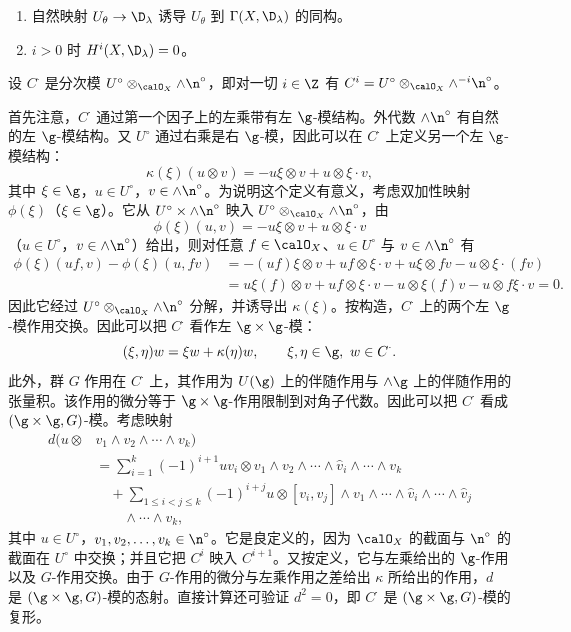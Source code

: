 \begin{theorem}\label{thm:02.2.6.1}
\begin{enumerate}[label=(\roman*)]
  \item 自然映射 $U_\theta\to \D_\lambda$ 诱导 $U_\theta$ 到 $\Gamma(X,\D_\lambda)$ 的同构。
  \item $i>0$ 时 $H^i(X,\D_\lambda)=0$。
\end{enumerate}
\end{theorem}

设 $C^\cdot$ 是分次模 $U^\circ\otimes_{\calO_X}\wedge\n^\circ$，即对一切 $i\in\Z$ 有 $C^i=U^\circ\otimes_{\calO_X}\wedge^{-i}\n^\circ$。

首先注意，$C^\cdot$ 通过第一个因子上的左乘带有左 $\g$-模结构。外代数 $\wedge\n^\circ$ 有自然的左 $\g$-模结构。又 $U^\circ$ 通过右乘是右 $\g$-模，因此可以在 $C^\cdot$ 上定义另一个左 $\g$-模结构：
\[
\kappa(\xi)(u\otimes v)=-u\xi\otimes v+u\otimes\xi\cdot v,
\]
其中 $\xi\in\g$，$u\in U^\circ$，$v\in\wedge\n^\circ$。为说明这个定义有意义，考虑双加性映射 $\phi(\xi)$（$\xi\in\g$）。它从 $U^\circ\times\wedge\n^\circ$ 映入 $U^\circ\otimes_{\calO_X}\wedge\n^\circ$，由
\[
\phi(\xi)(u,v)=-u\xi\otimes v+u\otimes\xi\cdot v
\]
（$u\in U^\circ$，$v\in\wedge\n^\circ$）给出，则对任意 $f\in\calO_X$、$u\in U^\circ$ 与 $v\in\wedge\n^\circ$ 有
\begin{align*}
\phi(\xi)(uf,v)-\phi(\xi)(u,fv)
&=-(uf)\xi\otimes v+uf\otimes\xi\cdot v+u\xi\otimes fv-u\otimes\xi\cdot(fv)\\
&=u\xi(f)\otimes v+uf\otimes\xi\cdot v-u\otimes\xi(f)v-u\otimes f\xi\cdot v=0 .
\end{align*}
因此它经过 $U^\circ\otimes_{\calO_X}\wedge\n^\circ$ 分解，并诱导出 $\kappa(\xi)$。按构造，$C^\cdot$ 上的两个左 $\g$-模作用交换。因此可以把 $C^\cdot$ 看作左 $\g\times\g$-模：
\[
(\xi,\eta)w=\xi w+\kappa(\eta)w,\qquad \xi,\eta\in\g,\ w\in C^\cdot .
\]
此外，群 $G$ 作用在 $C^\cdot$ 上，其作用为 $U(\g)$ 上的伴随作用与 $\wedge\g$ 上的伴随作用的张量积。该作用的微分等于 $\g\times\g$-作用限制到对角子代数。因此可以把 $C^\cdot$ 看成 $(\g\times\g,G)$-模。考虑映射
\begin{align*}
d(u\otimes &v_1\wedge v_2\wedge\cdots\wedge v_k)\\
&=\sum_{i=1}^{k}(-1)^{i+1}uv_i\otimes v_1\wedge v_2\wedge\cdots\wedge\hat v_i\wedge\cdots\wedge v_k\\
&\quad+\sum_{1\le i<j\le k}(-1)^{i+j}u\otimes[v_i,v_j]\wedge v_1\wedge\cdots\wedge\hat v_i\wedge\cdots\wedge\hat v_j\\
&\qquad\wedge\cdots\wedge v_k,
\end{align*}
其中 $u\in U^\circ$，$v_1,v_2,\dots,v_k\in\n^\circ$。它是良定义的，因为 $\calO_X$ 的截面与 $\n^\circ$ 的截面在 $U^\circ$ 中交换；并且它把 $C^i$ 映入 $C^{i+1}$。又按定义，它与左乘给出的 $\g$-作用以及 $G$-作用交换。由于 $G$-作用的微分与左乘作用之差给出 $\kappa$ 所给出的作用，$d$ 是 $(\g\times\g,G)$-模的态射。直接计算还可验证 $d^2=0$，即 $C^\cdot$ 是 $(\g\times\g,G)$-模的复形。

